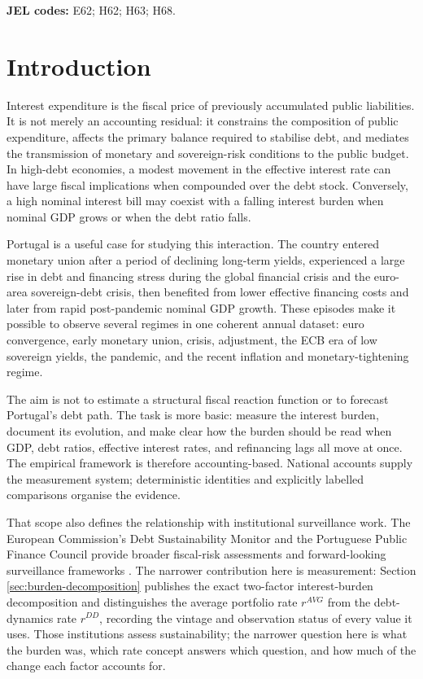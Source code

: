 \documentclass[11pt,a4paper]{article}
\begin{document}
\noindent\textbf{JEL codes:} E62; H62; H63; H68.

\newpage
\tableofcontents
\newpage

\section{Introduction}

Interest expenditure is the fiscal price of previously accumulated public
liabilities. It is not merely an accounting residual: it constrains the
composition of public expenditure, affects the primary balance required to
stabilise debt, and mediates the transmission of monetary and sovereign-risk
conditions to the public budget. In high-debt economies, a modest movement in
the effective interest rate can have large fiscal implications when compounded
over the debt stock. Conversely, a high nominal interest bill may coexist with
a falling interest burden when nominal GDP grows or when the debt ratio falls.

Portugal is a useful case for studying this interaction. The country entered
monetary union after a period of declining long-term yields, experienced a
large rise in debt and financing stress during the global financial crisis and
the euro-area sovereign-debt crisis, then benefited from lower effective
financing costs and later from rapid post-pandemic nominal GDP growth. These
episodes make it possible to observe several regimes in one coherent annual
dataset: euro convergence, early monetary union, crisis, adjustment, the ECB
era of low sovereign yields, the pandemic, and the recent inflation and
monetary-tightening regime.

The aim is not to estimate a structural fiscal reaction function or to forecast
Portugal's debt path. The task is more basic: measure the interest burden,
document its evolution, and make clear how the burden should be read when GDP,
debt ratios, effective interest rates, and refinancing lags all move at once.
The empirical framework is therefore accounting-based. National accounts supply
the measurement system; deterministic identities and explicitly labelled
comparisons organise the evidence.

That scope also defines the relationship with institutional surveillance work.
The European Commission's Debt Sustainability Monitor and the Portuguese Public
Finance Council provide broader fiscal-risk assessments and forward-looking
surveillance frameworks \cite{ec_dsm2025,cfp2025}. The narrower contribution
here is measurement: Section \ref{sec:burden-decomposition} publishes the
exact two-factor interest-burden decomposition and distinguishes the average
portfolio rate \(r^{AVG}\) from the debt-dynamics rate \(r^{DD}\), recording
the vintage and observation status of every value it uses. Those institutions
assess sustainability; the narrower question here is what the burden was, which
rate concept answers which question, and how much of the change each factor
accounts for.
\end{document}
